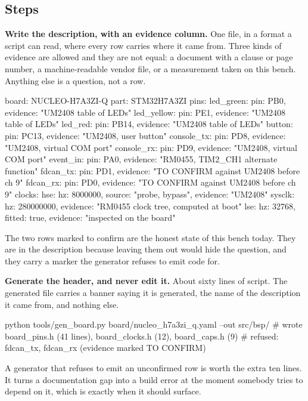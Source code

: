 \subsection*{Steps}

\begin{steps}
\item \textbf{Write the description, with an evidence column.} One file, in a
format a script can read, where every row carries where it came from. Three
kinds of evidence are allowed and they are not equal: a document with a clause
or page number, a machine-readable vendor file, or a measurement taken on this
bench. Anything else is a question, not a row.
\begin{plaincode}
board: NUCLEO-H7A3ZI-Q
part:  STM32H7A3ZI
pins:
  led_green:   { pin: PB0,  evidence: "UM2408 table of LEDs" }
  led_yellow:  { pin: PE1,  evidence: "UM2408 table of LEDs" }
  led_red:     { pin: PB14, evidence: "UM2408 table of LEDs" }
  button:      { pin: PC13, evidence: "UM2408, user button" }
  console_tx:  { pin: PD8,  evidence: "UM2408, virtual COM port" }
  console_rx:  { pin: PD9,  evidence: "UM2408, virtual COM port" }
  event_in:    { pin: PA0,  evidence: "RM0455, TIM2_CH1 alternate function" }
  fdcan_tx:    { pin: PD1,  evidence: "TO CONFIRM against UM2408 before ch 9" }
  fdcan_rx:    { pin: PD0,  evidence: "TO CONFIRM against UM2408 before ch 9" }
clocks:
  hse:    { hz: 8000000,   source: "probe, bypass", evidence: "UM2408" }
  sysclk: { hz: 280000000, evidence: "RM0455 clock tree, computed at boot" }
  lse:    { hz: 32768,     fitted: true, evidence: "inspected on the board" }
\end{plaincode}
The two rows marked to confirm are the honest state of this bench today. They
are in the description because leaving them out would hide the question, and
they carry a marker the generator refuses to emit code for.

\item \textbf{Generate the header, and never edit it.} About sixty lines of
script. The generated file carries a banner saying it is generated, the name of
the description it came from, and nothing else.
\begin{shellcode}
python tools/gen_board.py board/nucleo_h7a3zi_q.yaml --out src/bsp/
# wrote board_pins.h (41 lines), board_clocks.h (12), board_caps.h (9)
# refused: fdcan_tx, fdcan_rx  (evidence marked TO CONFIRM)
\end{shellcode}
A generator that refuses to emit an unconfirmed row is worth the extra ten
lines. It turns a documentation gap into a build error at the moment somebody
tries to depend on it, which is exactly when it should surface.


\end{steps}
